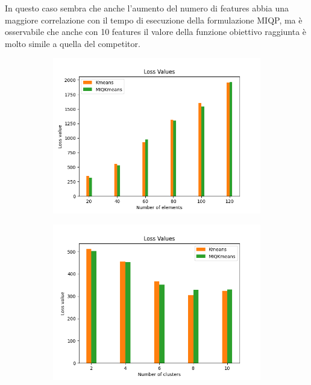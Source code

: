 \documentclass{article}
\begin{document}
    In questo caso sembra che anche l'aumento del numero di features abbia una maggiore correlazione con il tempo di esecuzione della formulazione MIQP, ma è osservabile che anche con 10 features il valore della funzione obiettivo raggiunta è molto simile a quella del competitor.
    \begin{figure}[h]
     \begin{subfigure}{0.32\linewidth}
         \includegraphics[width=\linewidth]{../results/plots/loss_size_sint2}
     \end{subfigure}%
     \begin{subfigure}{0.32\linewidth}
         \includegraphics[width=\linewidth]{../results/plots/loss_centers_sint2}
     \end{subfigure}%

\end{figure}
\end{document}
